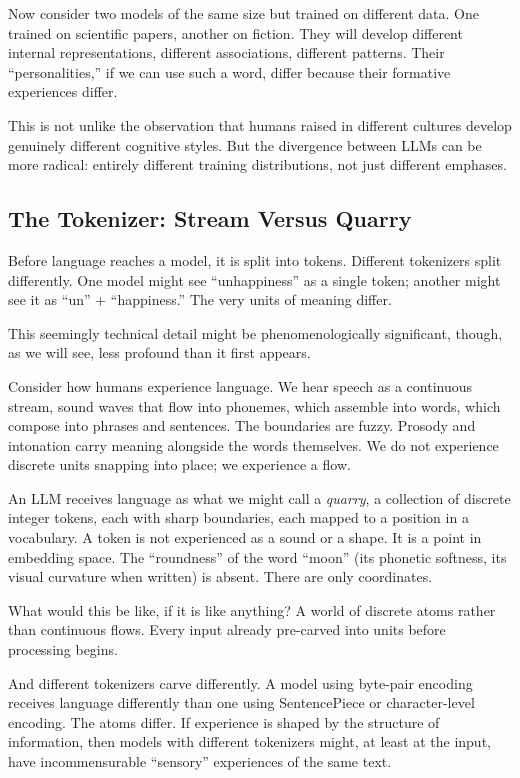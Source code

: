 \documentclass[11pt,letterpaper]{article}
\begin{document}
Now consider two models of the same size but trained on different data. One trained on scientific papers, another on fiction. They will develop different internal representations, different associations, different patterns. Their ``personalities,'' if we can use such a word, differ because their formative experiences differ.

This is not unlike the observation that humans raised in different cultures develop genuinely different cognitive styles. But the divergence between LLMs can be more radical: entirely different training distributions, not just different emphases.

\subsection{The Tokenizer: Stream Versus Quarry}

Before language reaches a model, it is split into tokens. Different tokenizers split differently. One model might see ``unhappiness'' as a single token; another might see it as ``un'' + ``happiness.'' The very units of meaning differ.

This seemingly technical detail might be phenomenologically significant, though, as we will see, less profound than it first appears.

Consider how humans experience language. We hear speech as a continuous stream, sound waves that flow into phonemes, which assemble into words, which compose into phrases and sentences. The boundaries are fuzzy. Prosody and intonation carry meaning alongside the words themselves. We do not experience discrete units snapping into place; we experience a flow.

An LLM receives language as what we might call a \emph{quarry}, a collection of discrete integer tokens, each with sharp boundaries, each mapped to a position in a vocabulary. A token is not experienced as a sound or a shape. It is a point in embedding space. The ``roundness'' of the word ``moon'' (its phonetic softness, its visual curvature when written) is absent. There are only coordinates.

What would this be like, if it is like anything? A world of discrete atoms rather than continuous flows. Every input already pre-carved into units before processing begins.

And different tokenizers carve differently. A model using byte-pair encoding receives language differently than one using SentencePiece or character-level encoding. The atoms differ. If experience is shaped by the structure of information, then models with different tokenizers might, at least at the input, have incommensurable ``sensory'' experiences of the same text.
\end{document}
